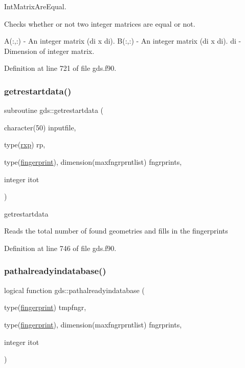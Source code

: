 Int\+Matrix\+Are\+Equal. 

Checks whether or not two integer matrices are equal or not.

A(\+:,\+:) -\/ An integer matrix (di x di). B(\+:,\+:) -\/ An integer matrix (di x di). di -\/ Dimension of integer matrix. 

Definition at line 721 of file gds.\+f90.

\mbox{\label{namespacegds_a5d4e82b09433cbfcc43b9cc754295ef5}} 
\subsubsection{\texorpdfstring{getrestartdata()}{getrestartdata()}}
{\footnotesize\ttfamily subroutine gds\+::getrestartdata (\begin{DoxyParamCaption}\item[{character(50)}]{inputfile,  }\item[{type(\mbox{\hyperlink{structrpath_1_1rxp}{rxp}})}]{rp,  }\item[{type(\mbox{\hyperlink{structrpath_1_1fingerprint}{fingerprint}}), dimension(maxfngrprntlist)}]{fngrprints,  }\item[{integer}]{itot }\end{DoxyParamCaption})}



getrestartdata 

Reads the total number of found geometries and fills in the fingerprints 

Definition at line 746 of file gds.\+f90.

\mbox{\label{namespacegds_a8f5bba1f0d5b4a0677d42ee10e0dd6d0}} 
\subsubsection{\texorpdfstring{pathalreadyindatabase()}{pathalreadyindatabase()}\hspace{0.1cm}{\footnotesize\ttfamily [2/2]}}
{\footnotesize\ttfamily logical function gds\+::pathalreadyindatabase (\begin{DoxyParamCaption}\item[{type(\mbox{\hyperlink{structrpath_1_1fingerprint}{fingerprint}})}]{tmpfngr,  }\item[{type(\mbox{\hyperlink{structrpath_1_1fingerprint}{fingerprint}}), dimension(maxfngrprntlist)}]{fngrprints,  }\item[{integer}]{itot }\end{DoxyParamCaption})}



